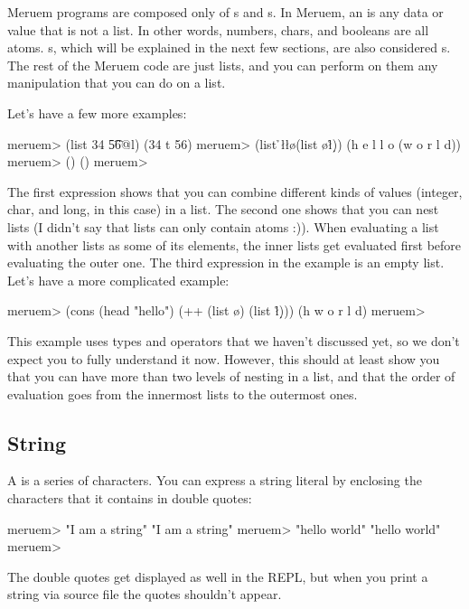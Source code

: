 Meruem programs are composed only of s and s. In Meruem, an  is any data or value that is not a list. In other words, numbers, chars, and booleans are all atoms. s, which will be explained in the next few sections, are also considered s. The rest of the Meruem code are just lists, and you can perform on them any manipulation that you can do on a list.

Let's have a few more examples:

\begin{REPL}
meruem> (list 34 \t 56@l) 
(34 t 56)
meruem> (list \h \e \l \l \o (list \w \o \r \l \d))
(h e l l o (w o r l d))
meruem> ()
()
meruem> 
\end{REPL}

The first expression shows that you can combine different kinds of values (integer, char, and long, in this case) in a list. The second one shows that you can nest lists (I didn't say that lists can only contain atoms :)). When evaluating a list with another lists as some of its elements, the inner lists get evaluated first before evaluating the outer one. The third expression in the example is an empty list. Let's have a more complicated example:

\begin{REPL}
meruem> (cons (head "hello") (++ (list \w \o) (list \r \l \d)))     
(h w o r l d)
meruem>
\end{REPL}

This example uses types and operators that we haven't discussed yet, so we don't expect you to fully understand it now. However, this should at least show you that you can have more than two levels of nesting in a list, and that the order of evaluation goes from the innermost lists to the outermost ones.

\subsection{String}
A  is a series of characters. You can express a string literal by enclosing the characters that it contains in double quotes:

\begin{REPL}
meruem> "I am a string"
"I am a string"
meruem> "hello world"
"hello world"
meruem> 
\end{REPL}

The double quotes get displayed as well in the REPL, but when you print a string via source file the quotes shouldn't appear. 


